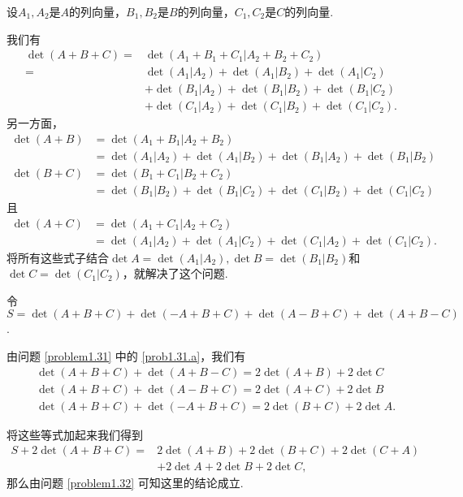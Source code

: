 \begin{solution}
  设$A_1,A_2$是$A$的列向量，$B_1,B_2$是$B$的列向量，$C_1,C_2$是$C$的列向量.

  我们有
  \begin{align*}
    \det(A+B+C) = {}& \det(A_1+B_1+C_1|A_2+B_2+C_2) \\
    = {}& \det(A_1|A_2) + \det(A_1|B_2) + \det(A_1|C_2) \\
    & + \det(B_1|A_2) + \det (B_1|B_2) + \det(B_1|C_2) \\
    & + \det(C_1|A_2) + \det (C_1|B_2) + \det (C_1|C_2).
  \end{align*}
  另一方面，
  \begin{align*}
    \det (A+B) & = \det (A_1+B_1|A_2+B_2) \\
    & = \det(A_1|A_2) + \det(A_1|B_2) + \det(B_1|A_2) + \det(B_1|B_2) \\
    \det (B+C) & = \det (B_1+C_1|B_2+C_2) \\
    & = \det(B_1|B_2) + \det(B_1|C_2) + \det(C_1|B_2) + \det(C_1|C_2)
  \end{align*}
  且
  \begin{align*}
    \det (A+C) & = \det (A_1+C_1|A_2+C_2) \\
    & = \det(A_1|A_2) + \det(A_1|C_2) + \det(C_1|A_2) + \det(C_1|C_2).
  \end{align*}
  将所有这些式子结合$\det A=\det(A_1|A_2),\det B=\det(B_1|B_2)$和$\det C=\det(C_1|C_2)$，就解决了这个问题.
\end{solution}

\begin{solution}
  令$S=\det(A+B+C) + \det(-A+B+C) + \det(A-B+C) + \det(A+B-C)$.

  由问题 \ref{problem1.31} 中的 \ref{prob1.31.a}，我们有
  \begin{align*}
    & \det (A+B+C) + \det(A+B-C) = 2\det(A+B) + 2\det C \\
    & \det(A+B+C) + \det(A-B+C) = 2\det(A+C) + 2\det B \\
    & \det (A+B+C) + \det(-A+B+C) = 2\det(B+C) + 2\det A.
  \end{align*}

  将这些等式加起来我们得到
  \begin{align*}
    S + 2 \det(A+B+C) = {}& 2\det(A+B) + 2\det(B+C) + 2\det(C+A) \\
    & + 2\det A + 2\det B + 2\det C,
  \end{align*}
  那么由问题 \ref{problem1.32} 可知这里的结论成立.
\end{solution}

